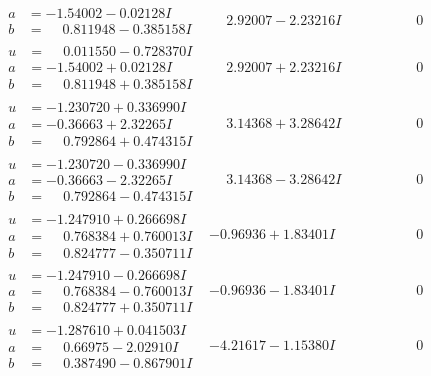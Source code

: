 \documentclass[1p]{elsarticle_modified}
\theoremstyle{definition}
\begin{document}
$$\begin{array}{c|c|c}
\begin{aligned}
a &= -1.54002 - 0.02128 I \\
b &= \phantom{-}0.811948 - 0.385158 I\end{aligned}
 & \phantom{-}2.92007 - 2.23216 I & \phantom{-0.000000 } 0 \\ \hline\begin{aligned}
u &= \phantom{-}0.011550 - 0.728370 I \\
a &= -1.54002 + 0.02128 I \\
b &= \phantom{-}0.811948 + 0.385158 I\end{aligned}
 & \phantom{-}2.92007 + 2.23216 I & \phantom{-0.000000 } 0 \\ \hline\begin{aligned}
u &= -1.230720 + 0.336990 I \\
a &= -0.36663 + 2.32265 I \\
b &= \phantom{-}0.792864 + 0.474315 I\end{aligned}
 & \phantom{-}3.14368 + 3.28642 I & \phantom{-0.000000 } 0 \\ \hline\begin{aligned}
u &= -1.230720 - 0.336990 I \\
a &= -0.36663 - 2.32265 I \\
b &= \phantom{-}0.792864 - 0.474315 I\end{aligned}
 & \phantom{-}3.14368 - 3.28642 I & \phantom{-0.000000 } 0 \\ \hline\begin{aligned}
u &= -1.247910 + 0.266698 I \\
a &= \phantom{-}0.768384 + 0.760013 I \\
b &= \phantom{-}0.824777 - 0.350711 I\end{aligned}
 & -0.96936 + 1.83401 I & \phantom{-0.000000 } 0 \\ \hline\begin{aligned}
u &= -1.247910 - 0.266698 I \\
a &= \phantom{-}0.768384 - 0.760013 I \\
b &= \phantom{-}0.824777 + 0.350711 I\end{aligned}
 & -0.96936 - 1.83401 I & \phantom{-0.000000 } 0 \\ \hline\begin{aligned}
u &= -1.287610 + 0.041503 I \\
a &= \phantom{-}0.66975 - 2.02910 I \\
b &= \phantom{-}0.387490 - 0.867901 I\end{aligned}
 & -4.21617 - 1.15380 I & \phantom{-0.000000 } 0\\

\end{array}$$
\end{document}
